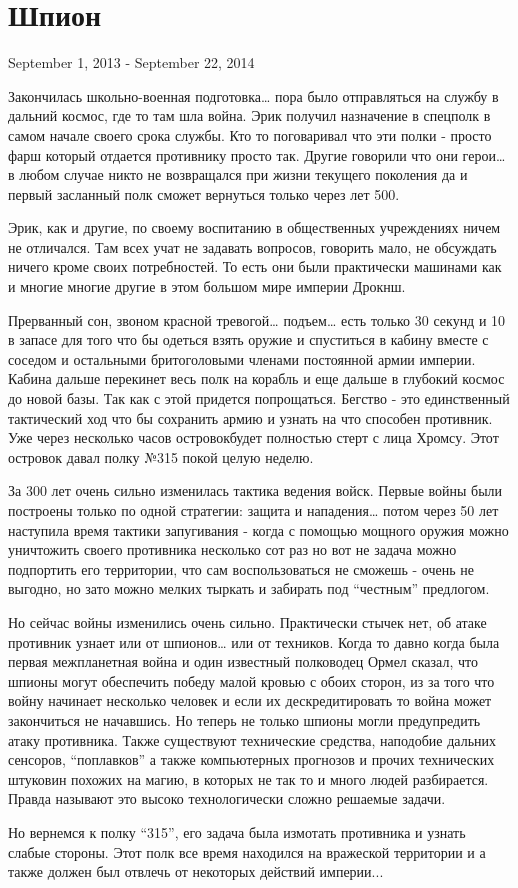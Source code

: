 \newpage
\section{Шпион}
{\centering
	September 1, 2013 - September 22, 2014\par
}
\par
Закончилась школьно-военная подготовка… пора было отправляться
на службу в дальний космос, где то там шла война.
Эрик получил назначение в спецполк в самом начале своего срока службы.
Кто то поговаривал что эти полки - просто фарш который отдается
противнику просто так. Другие говорили что они герои… в любом случае
никто не возвращался при жизни текущего поколения да и первый засланный
полк сможет вернуться только через лет 500. 
\par
Эрик, как и другие, по своему воспитанию в общественных учреждениях
ничем не отличался. Там всех учат не задавать вопросов, говорить мало,
не обсуждать ничего кроме своих потребностей. То есть они были
практически машинами как и многие многие другие в этом большом мире империи Дрокнш.
\par
Прерванный сон, звоном красной тревогой… подъем… есть только 30 секунд и
10 в запасе для того что бы одеться взять оружие и спуститься в кабину
вместе с соседом и остальными бритоголовыми членами постоянной армии империи.
Кабина дальше перекинет весь полк на корабль и еще дальше в глубокий
космос до новой базы. Так как с этой придется попрощаться. Бегство - это
единственный тактический ход что бы сохранить армию и узнать на что
способен противник. Уже через несколько часов островокбудет полностью
стерт с лица Хромсу. Этот островок давал полку №315 покой целую неделю.
\par
За 300 лет очень сильно изменилась тактика ведения войск. Первые войны
были построены только по одной стратегии: защита и нападения… потом через
50 лет наступила время тактики запугивания - когда с помощью мощного оружия
можно уничтожить своего противника несколько сот раз но вот не задача
можно подпортить его территории, что сам воспользоваться не сможешь -
очень не выгодно, но зато можно мелких тыркать и забирать
под “честным” предлогом. 
\par
Но сейчас войны изменились очень сильно. Практически стычек нет, об
атаке противник узнает или от шпионов… или от техников. Когда то давно
когда была первая межпланетная война и один известный полководец Ормел
сказал, что шпионы могут обеспечить победу малой кровью с обоих сторон,
из за того что войну начинает несколько человек и если их
дескредитировать то война может закончиться не начавшись.
Но теперь не только шпионы могли предупредить атаку противника.
Также существуют технические средства, наподобие дальних сенсоров,
“поплавков” а также  компьютерных прогнозов и прочих технических
штуковин похожих на магию, в которых не так то и много людей разбирается.
Правда называют это высоко технологически сложно решаемые задачи.
\par
Но вернемся к полку “315”, его задача была измотать противника и узнать
слабые стороны. Этот полк все время находился на вражеской территории
и а также должен был отвлечь от некоторых действий империи...
\par
